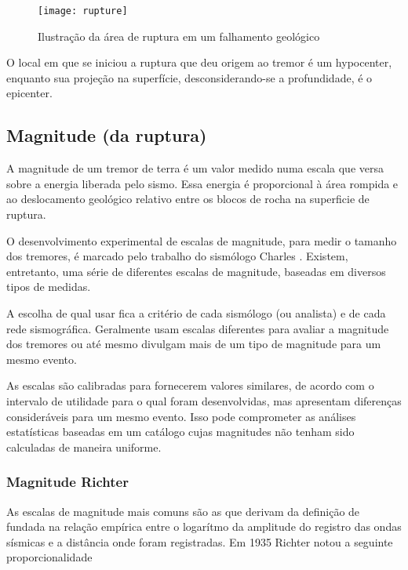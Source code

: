 \begin{figure}[H]
   \centering
   \texttt{[image: rupture]}
   \caption[Ilustração da área de ruptura em um falhamento geológico]
   		   {Ilustração da área de ruptura em um falhamento geológico\footnotemark}
   \label{f:rupture}
\end{figure}


O local em que se iniciou a ruptura que deu origem ao tremor é um \gls{hypocenter},
enquanto sua projeção na superfície, desconsiderando-se a profundidade, é o \gls{epicenter}.


\subsection[Magnitude]{Magnitude (da ruptura)}
\label{sec:magnitude}

A magnitude de um tremor de terra é um valor medido numa escala que versa sobre a energia liberada pelo sismo.
Essa energia é proporcional à área rompida e ao deslocamento geológico relativo entre os blocos de rocha na superficie
de ruptura.

O desenvolvimento experimental de escalas de magnitude, para medir o tamanho dos tremores,
é marcado pelo trabalho do sismólogo Charles \citet{richter_1935}. Existem, entretanto,
uma série de diferentes escalas de magnitude, baseadas em diversos tipos de medidas.

A escolha de qual usar fica a critério
de cada sismólogo (ou analista) e de cada rede sismográfica.
Geralmente usam escalas diferentes
para avaliar a magnitude dos tremores ou até mesmo divulgam mais de um tipo de magnitude para
um mesmo evento.

As escalas são calibradas para fornecerem valores similares, de acordo com
o intervalo de utilidade para o qual foram desenvolvidas, mas apresentam diferenças consideráveis para um mesmo evento.
Isso pode comprometer as análises estatísticas baseadas em um catálogo
cujas magnitudes não tenham sido calculadas de maneira uniforme.


\subsubsection{Magnitude Richter}
\label{sec:magnitude_richter}

As escalas de magnitude mais comuns são as que derivam da definição de \citet{richter_1935}
fundada na relação empírica entre o logarítmo da amplitude do registro das ondas sísmicas e a distância onde foram
registradas. Em 1935 Richter notou a seguinte proporcionalidade

